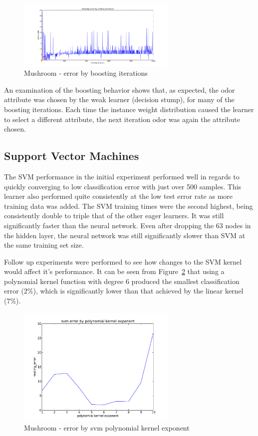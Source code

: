 \documentclass{sig-alternate}
\begin{document}
\begin{figure}[!htbp]
    \centering
    \includegraphics[width=3in]{data/agaricus-lepiota/boosting/training-iterations.pdf}
    \caption{Mushroom - error by boosting iterations \label{ag-boost-iter}}
\end{figure} 

An examination of the boosting behavior shows that, as expected, the odor attribute was chosen by the weak learner (decision stump), for many of the boosting iterations. Each time the instance weight distribution caused the learner to select a different attribute, the next iteration odor was again the attribute chosen.


\subsection{Support Vector Machines}

The SVM performance in the initial experiment performed well in regards to quickly converging to low classification error with just over 500 samples. This learner also performed quite consistently at the low test error rate as more training data was added. The SVM training times were the second highest, being consistently double to triple that of the other eager learners. It was still significantly faster than the neural network. Even after dropping the 63 nodes in the hidden layer, the neural network was still significantly slower than SVM at the same training set size.

Follow up experiments were performed to see how changes to the SVM kernel would affect it's performance. It can be seen from Figure~\ref{ag-svm-poly} that using a polynomial kernel function with degree 6 produced the smallest classification error (2\%), which is significantly lower than that achieved by the linear kernel (7\%).

\begin{figure}[!htbp]
    \centering
    \includegraphics[width=3in]{data/agaricus-lepiota/svm/polynomial.pdf}
    \caption{Mushroom - error by svm polynomial kernel exponent \label{ag-svm-poly}}
\end{figure} 
\end{document}
